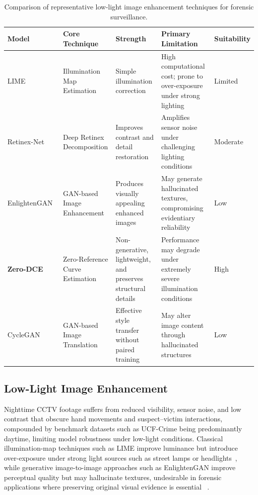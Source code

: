 \documentclass[runningheads]{llncs}
\begin{document}
\begin{table}[!t]
\centering
\scriptsize
\renewcommand{\arraystretch}{1.2}
\caption{Comparison of representative low-light image enhancement techniques for forensic surveillance.}
\label{tab:lowlight_comparison}

\begin{tabular}{|l|p{3.0cm}|p{3.5cm}|p{3.8cm}|p{2.5cm}|}
\hline
\textbf{Model} &
\textbf{Core Technique} &
\textbf{Strength} &
\textbf{Primary Limitation} &
\textbf{Suitability} \\ \hline

LIME~\cite{lime} &
Illumination Map Estimation &
Simple illumination correction &
High computational cost; prone to over-exposure under strong lighting &
Limited \\ \hline

Retinex-Net~\cite{retinexnet} &
Deep Retinex Decomposition &
Improves contrast and detail restoration &
Amplifies sensor noise under challenging lighting conditions &
Moderate \\ \hline

EnlightenGAN~\cite{enlightengan} &
GAN-based Image Enhancement &
Produces visually appealing enhanced images &
May generate hallucinated textures, compromising evidentiary reliability &
Low \\ \hline

\textbf{Zero-DCE}~\cite{zerodce} &
Zero-Reference Curve Estimation &
Non-generative, lightweight, and preserves structural details &
Performance may degrade under extremely severe illumination conditions &
High \\ \hline

CycleGAN~\cite{cyclegan} &
GAN-based Image Translation &
Effective style transfer without paired training &
May alter image content through hallucinated structures &
Low \\ \hline

\end{tabular}
\end{table}

\subsection{Low-Light Image Enhancement}
Nighttime CCTV footage suffers from reduced visibility, sensor noise,
and low contrast that obscure hand movements and suspect--victim
interactions, compounded by benchmark datasets such as UCF-Crime \cite{sultani2018ucfcrime} being
predominantly daytime, limiting model robustness under low-light
conditions. Classical illumination-map techniques such as LIME improve
luminance but introduce over-exposure under strong light sources such
as street lamps or headlights~\cite{lime}, while generative
image-to-image approaches such as EnlightenGAN improve perceptual
quality but may hallucinate textures, undesirable in forensic
applications where preserving original visual evidence is essential
~\cite{enlightengan}.
\end{document}
